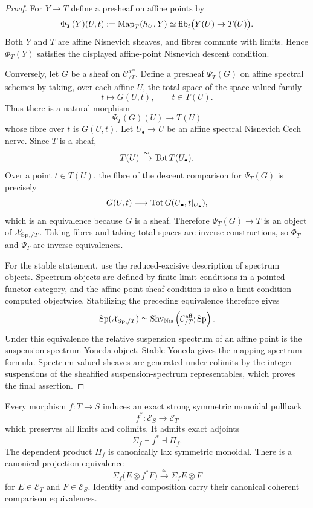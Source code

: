 \begin{proof}
For \(Y\to T\) define a presheaf on affine points by
\[
    \Phi_T(Y)(U,t)
    :=
    \operatorname{Map}_T(h_U,Y)
    \simeq
    \operatorname{fib}_t\bigl(Y(U)\to T(U)\bigr).
\]
Both \(Y\) and \(T\) are affine Nisnevich sheaves, and fibres commute with limits.  Hence
\(\Phi_T(Y)\) satisfies the displayed affine-point Nisnevich descent condition.

Conversely, let \(G\) be a sheaf on \(\mathcal C^{\mathrm{aff}}_{/T}\).  Define a presheaf
\(\Psi_T(G)\) on affine spectral schemes by taking, over each affine \(U\), the total space of the
space-valued family
\[
    t\longmapsto G(U,t),
    \qquad t\in T(U).
\]
Thus there is a natural morphism
\[
    \Psi_T(G)(U)\longrightarrow T(U)
\]
whose fibre over \(t\) is \(G(U,t)\).  Let \(U_\bullet\to U\) be an affine spectral Nisnevich
\v{C}ech nerve.  Since \(T\) is a sheaf,
\[
    T(U)\xrightarrow{\simeq}\operatorname*{Tot} T(U_\bullet).
\]
Over a point \(t\in T(U)\), the fibre of the descent comparison for \(\Psi_T(G)\) is precisely
\[
    G(U,t)
    \longrightarrow
    \operatorname*{Tot} G(U_\bullet,t|_{U_\bullet}),
\]
which is an equivalence because \(G\) is a sheaf.  Therefore \(\Psi_T(G)\to T\) is an object of
\(\mathcal X_{\mathrm{Sp},/T}\).  Taking fibres and taking total spaces are inverse constructions, so
\(\Phi_T\) and \(\Psi_T\) are inverse equivalences.

For the stable statement, use the reduced-excisive description of spectrum objects.  Spectrum
objects are defined by finite-limit conditions in a pointed functor category, and the affine-point
sheaf condition is also a limit condition computed objectwise.  Stabilizing the preceding
equivalence therefore gives
\[
    \mathrm{Sp}(\mathcal X_{\mathrm{Sp},/T})
    \simeq
    \operatorname{Shv}_{\mathrm{Nis}}
    \left(
        \mathcal C^{\mathrm{aff}}_{/T};\mathrm{Sp}
    \right).
\]
Under this equivalence the relative suspension spectrum of an affine point is the suspension-spectrum
Yoneda object.  Stable Yoneda gives the mapping-spectrum formula.  Spectrum-valued sheaves are
generated under colimits by the integer suspensions of the sheafified suspension-spectrum
representables, which proves the final assertion.
\end{proof}

\begin{theorem}
\label{thm:monadic-de-rham-stable-adjunction}
Every morphism \(f:T\to S\) induces an exact strong symmetric monoidal pullback
\[
    f^*:\mathcal E_S\longrightarrow\mathcal E_T
\]
which preserves all limits and colimits.  It admits exact adjoints
\[
\boxed{
    \Sigma_f\dashv f^*\dashv \Pi_f.
}
\]
The dependent product \(\Pi_f\) is canonically lax symmetric monoidal.  There is a canonical projection
equivalence
\[
\boxed{
    \Sigma_f\bigl(E\otimes f^*F\bigr)
    \xrightarrow{\simeq}
    \Sigma_f E\otimes F
}
\]
for \(E\in\mathcal E_T\) and \(F\in\mathcal E_S\).  Identity and composition carry their canonical
coherent comparison equivalences.
\end{theorem}

